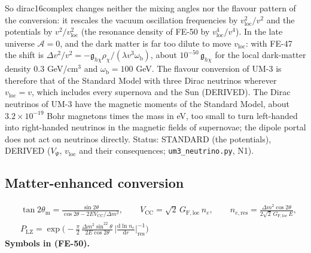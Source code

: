 \documentclass[
  10pt,
]{article}
\begin{document}
So dirac16complex changes neither the mixing angles nor the flavour
pattern of the conversion: it rescales the vacuum oscillation
frequencies by \(v_{\mathrm{loc}}^2/v^2\) and the potentials by
\(v^2/v_{\mathrm{loc}}^2\) (the resonance density of FE-50 by
\(v_{\mathrm{loc}}^4/v^4\)). In the late universe \(\mathcal{A} = 0\),
and the dark matter is far too dilute to move \(v_{\mathrm{loc}}\): with
FE-47 the shift is
\(\Delta v^2/v^2 = -\mathfrak{g}_{h\chi}\rho_\chi/(\lambda v^3\omega_{\mathrm{b}})\),
about \(10^{-50}\,\mathfrak{g}_{h\chi}\) for the local dark-matter
density \(0.3\) GeV/cm\(^3\) and \(\omega_{\mathrm{b}} = 100\) GeV. The
flavour conversion of UM-3 is therefore that of the Standard Model with
three Dirac neutrinos wherever \(v_{\mathrm{loc}} = v\), which includes
every supernova and the Sun (DERIVED). The Dirac neutrinos of UM-3 have
the magnetic moments of the Standard Model, about \(3.2\times10^{-19}\)
Bohr magnetons times the mass in eV, too small to turn left-handed into
right-handed neutrinos in the magnetic fields of supernovae; the dipole
portal does not act on neutrinos directly. Status: STANDARD (the
potentials), DERIVED (\(V_\Psi\), \(v_{\mathrm{loc}}\) and their
consequences; \texttt{um3\_neutrino.py}, N1).

\hypertarget{matter-enhanced-conversion}{%
\subsection{Matter-enhanced
conversion}\label{matter-enhanced-conversion}}

\[
\begin{aligned}
&\tan2\theta_{\mathrm{m}} = \frac{\sin2\theta}{\cos2\theta - 2EV_{\mathrm{CC}}/\Delta m^2},\qquad
 V_{\mathrm{CC}} = \sqrt2\,G_{\mathrm{F,loc}}\,n_e,\qquad
 n_{e,\mathrm{res}} = \frac{\Delta m^2\cos2\theta}{2\sqrt2\,G_{\mathrm{F,loc}}\,E},\\
&P_{\mathrm{LZ}} = \exp\Big(-\frac{\pi}{2}\,\frac{\Delta m^2\sin^22\theta}{2E\cos2\theta}\,\Big\lvert\frac{\mathrm{d}\ln n_e}{\mathrm{d}r}\Big\rvert^{-1}_{\mathrm{res}}\Big)
\end{aligned} \tag{FE-50}
\] \textbf{Symbols in (FE-50).}
\end{document}
